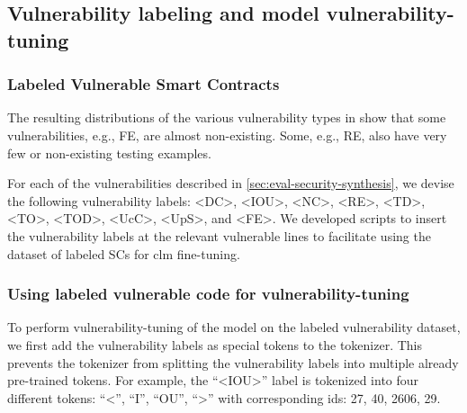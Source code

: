 \documentclass[12pt]{book}
\begin{document}
\subsection{Vulnerability labeling and model vulnerability-tuning}
\label{sec:vulnerablity-labeling}

\subsubsection{Labeled Vulnerable Smart Contracts}
\label{sec:labeled-vulnerable-smart-contracts}
The resulting distributions of the various vulnerability types in  show that some vulnerabilities, e.g., FE, are almost non-existing. Some, e.g., RE, also have very few or non-existing testing examples.

For each of the vulnerabilities described in \cref{sec:eval-security-synthesis}, we devise the following vulnerability labels: \textless DC\textgreater, \textless IOU\textgreater, \textless NC\textgreater, \textless RE\textgreater, \textless TD\textgreater, \textless TO\textgreater, \textless TOD\textgreater, \textless UcC\textgreater, \textless UpS\textgreater, and \textless FE\textgreater. We developed scripts to insert the vulnerability labels at the relevant vulnerable lines to facilitate using the dataset of labeled SCs for \acrfull{clm} fine-tuning.

\subsubsection{Using labeled vulnerable code for vulnerability-tuning}
\label{sec:vulnerability-labeling-fine-tuning}

To perform vulnerability-tuning of the model on the labeled vulnerability dataset, we first add the vulnerability labels as special tokens to the tokenizer. This prevents the tokenizer from splitting the vulnerability labels into multiple already pre-trained tokens. For example, the ``\textless IOU\textgreater'' label is tokenized into four different tokens: ``\textless'', ``I'', ``OU'', ``\textgreater'' with corresponding ids: 27, 40, 2606, 29. 
\end{document}
